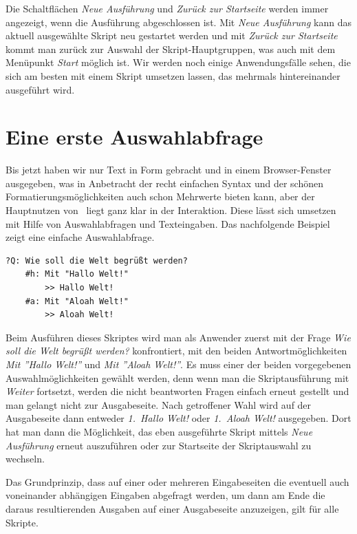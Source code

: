 Die Schaltflächen \emph{Neue Ausführung} und \emph{Zurück zur Startseite} werden immer angezeigt, wenn die Ausführung abgeschlossen ist. Mit \emph{Neue Ausführung} kann das aktuell ausgewählte Skript neu gestartet werden und mit \emph{Zurück zur Startseite} kommt man zurück zur Auswahl der Skript-Hauptgruppen, was auch mit dem Menüpunkt \emph{Start} möglich ist. Wir werden noch einige Anwendungsfälle sehen, die sich am besten mit einem Skript umsetzen lassen, das mehrmals hintereinander ausgeführt wird.

\section{Eine erste Auswahlabfrage}
Bis jetzt haben wir nur Text in Form gebracht und in einem Browser-Fenster ausgegeben, was in Anbetracht der recht einfachen Syntax und der schönen Formatierungsmöglichkeiten auch schon Mehrwerte bieten kann, aber der Hauptnutzen von \FPZ\ liegt ganz klar in der Interaktion. Diese lässt sich umsetzen mit Hilfe von Auswahlabfragen und Texteingaben. Das nachfolgende Beispiel zeigt eine einfache Auswahlabfrage.

\begin{verbatim}
?Q: Wie soll die Welt begrüßt werden?
    #h: Mit "Hallo Welt!"
        >> Hallo Welt!
    #a: Mit "Aloah Welt!"
        >> Aloah Welt!
\end{verbatim}

Beim Ausführen dieses Skriptes wird man als Anwender zuerst mit der Frage \emph{Wie soll die Welt begrüßt werden?} konfrontiert, mit den beiden Antwortmöglichkeiten \emph{Mit ''Hallo Welt!''} und \emph{Mit ''Aloah Welt!''}. Es muss einer der beiden vorgegebenen Auswahlmöglichkeiten gewählt werden, denn wenn man die Skriptausführung mit \emph{Weiter} fortsetzt, werden die nicht beantworten Fragen einfach erneut gestellt und man gelangt nicht zur Ausgabeseite.  Nach getroffener Wahl wird auf der Ausgabeseite dann entweder \emph{1.\ Hallo Welt!} oder \emph{1.\ Aloah Welt!} ausgegeben. Dort hat man dann die Möglichkeit, das eben ausgeführte Skript mittels \emph{Neue Ausführung} erneut auszuführen oder zur Startseite der Skriptauswahl zu wechseln.

Das Grundprinzip, dass auf einer oder mehreren Eingabeseiten die eventuell auch voneinander abhängigen Eingaben abgefragt werden, um dann am Ende die daraus resultierenden Ausgaben auf einer Ausgabeseite anzuzeigen, gilt für alle Skripte.

